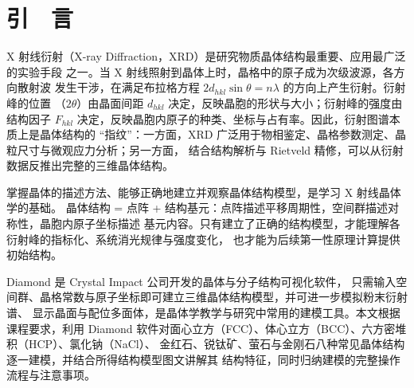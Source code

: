 \section{引　言}

X 射线衍射（X-ray Diffraction，XRD）是研究物质晶体结构最重要、应用最广泛的实验手段
之一\cite{liang1991xray}。当 X 射线照射到晶体上时，晶格中的原子成为次级波源，各方向散射波
发生干涉，在满足布拉格方程 $2d_{hkl}\sin\theta=n\lambda$ 的方向上产生衍射。衍射峰的位置
（$2\theta$）由晶面间距 $d_{hkl}$ 决定，反映晶胞的形状与大小；衍射峰的强度由结构因子
$F_{hkl}$ 决定，反映晶胞内原子的种类、坐标与占有率。因此，衍射图谱本质上是晶体结构的
``指纹''：一方面，XRD 广泛用于物相鉴定、晶格参数测定、晶粒尺寸与微观应力分析；另一方面，
结合结构解析与 Rietveld 精修，可以从衍射数据反推出完整的三维晶体结构。

掌握晶体的描述方法、能够正确地建立并观察晶体结构模型，是学习 X 射线晶体学的基础。
晶体结构 = 点阵 + 结构基元：点阵描述平移周期性，空间群描述对称性，晶胞内原子坐标描述
基元内容。只有建立了正确的结构模型，才能理解各衍射峰的指标化、系统消光规律与强度变化，
也才能为后续第一性原理计算提供初始结构\cite{huang1988solid}。

Diamond 是 Crystal Impact 公司开发的晶体与分子结构可视化软件\cite{diamond2023manual}，
只需输入空间群、晶格常数与原子坐标即可建立三维晶体结构模型，并可进一步模拟粉末衍射谱、
显示晶面与配位多面体，是晶体学教学与研究中常用的建模工具。本文根据课程要求，利用
Diamond 软件对面心立方（FCC）、体心立方（BCC）、六方密堆积（HCP）、氯化钠（NaCl）、
金红石、锐钛矿、萤石与金刚石八种常见晶体结构逐一建模，并结合所得结构模型图文讲解其
结构特征，同时归纳建模的完整操作流程与注意事项。

